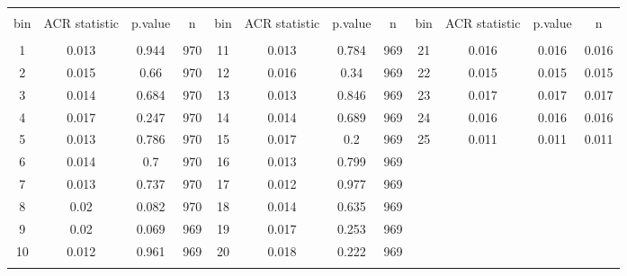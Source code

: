 
\begin{tabular}{@{\extracolsep{5pt}} cccc|cccc|cccc} 
\\[-1.8ex]\hline 
\hline \\[-1.8ex] 
bin & ACR statistic & p.value & n & bin & ACR statistic & p.value & n & bin & ACR statistic & p.value & n \\ 
\hline \\[-1.8ex] 
1 & 0.013 & 0.944 & 970 & 11 & 0.013 & 0.784 & 969 & 21 & 0.016 & 0.016 & 0.016 \\ 
2 & 0.015 & 0.66 & 970 & 12 & 0.016 & 0.34 & 969 & 22 & 0.015 & 0.015 & 0.015 \\ 
3 & 0.014 & 0.684 & 970 & 13 & 0.013 & 0.846 & 969 & 23 & 0.017 & 0.017 & 0.017 \\ 
4 & 0.017 & 0.247 & 970 & 14 & 0.014 & 0.689 & 969 & 24 & 0.016 & 0.016 & 0.016 \\ 
5 & 0.013 & 0.786 & 970 & 15 & 0.017 & 0.2 & 969 & 25 & 0.011 & 0.011 & 0.011 \\ 
6 & 0.014 & 0.7 & 970 & 16 & 0.013 & 0.799 & 969 &  &  &  &  \\ 
7 & 0.013 & 0.737 & 970 & 17 & 0.012 & 0.977 & 969 &  &  &  &  \\ 
8 & 0.02 & 0.082 & 970 & 18 & 0.014 & 0.635 & 969 &  &  &  &  \\ 
9 & 0.02 & 0.069 & 969 & 19 & 0.017 & 0.253 & 969 &  &  &  &  \\ 
10 & 0.012 & 0.961 & 969 & 20 & 0.018 & 0.222 & 969 &  &  &  &  \\ 
\hline \\[-1.8ex] 
\end{tabular} 
